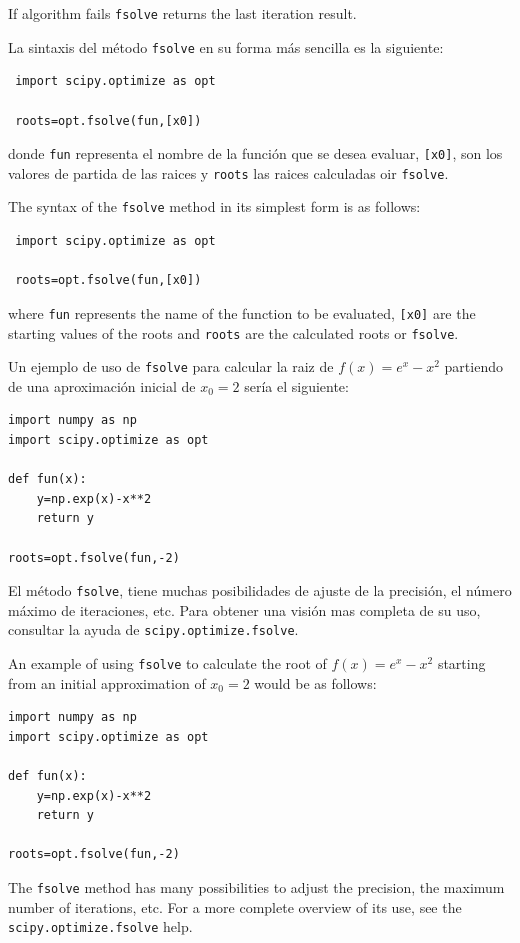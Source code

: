 \begin{paracol}{2}
If algorithm fails \texttt{fsolve} returns the last iteration result.

\switchcolumn

La sintaxis del método \texttt{fsolve} en su forma más sencilla es la siguiente:

\begin{verbatim}
 import scipy.optimize as opt

 roots=opt.fsolve(fun,[x0])    
\end{verbatim}


donde \texttt{fun} representa el nombre de la función que se desea evaluar, \texttt{[x0]}, son los valores de partida de las raices  y \texttt{roots} las raices calculadas oir \texttt{fsolve}. 

\switchcolumn
The syntax of the \texttt{fsolve} method in its simplest form is as follows:

\begin{verbatim}
 import scipy.optimize as opt

 roots=opt.fsolve(fun,[x0])
\end{verbatim}

where \texttt{fun} represents the name of the function to be evaluated, \texttt{[x0]} are the starting values of the roots and \texttt{roots} are the calculated roots or \texttt{fsolve}.

\switchcolumn

Un ejemplo de uso de \texttt{fsolve} para calcular la raiz de $f(x)=e^x-x^2$ partiendo de una aproximación inicial de $x_0=2$ sería el siguiente:

\begin{verbatim}
import numpy as np
import scipy.optimize as opt

def fun(x):
    y=np.exp(x)-x**2
    return y

roots=opt.fsolve(fun,-2)

\end{verbatim}

El método \texttt{fsolve}, tiene muchas posibilidades de ajuste de la precisión, el número máximo de iteraciones, etc. Para obtener una visión mas completa de su uso, consultar la ayuda de \texttt{scipy.optimize.fsolve}.

\switchcolumn
An example of using \texttt{fsolve} to calculate the root of $f(x)=e^x-x^2$ starting from an initial approximation of $x_0=2$ would be as follows:

\begin{verbatim}
import numpy as np
import scipy.optimize as opt

def fun(x):
    y=np.exp(x)-x**2
    return y

roots=opt.fsolve(fun,-2)

\end{verbatim}

The \texttt{fsolve} method has many possibilities to adjust the precision, the maximum number of iterations, etc. For a more complete overview of its use, see the \texttt{scipy.optimize.fsolve} help.

\end{paracol}


